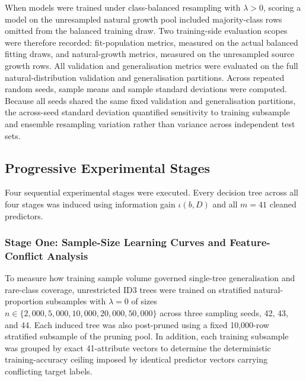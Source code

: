 When models were trained under class-balanced resampling with $\lambda > 0$, scoring a model on the unresampled natural growth pool included majority-class rows omitted from the balanced training draw. Two training-side evaluation scopes were therefore recorded: fit-population metrics, measured on the actual balanced fitting draws, and natural-growth metrics, measured on the unresampled source growth rows. All validation and generalisation metrics were evaluated on the full natural-distribution validation and generalisation partitions. Across repeated random seeds, sample means and sample standard deviations were computed. Because all seeds shared the same fixed validation and generalisation partitions, the across-seed standard deviation quantified sensitivity to training subsample and ensemble resampling variation rather than variance across independent test sets.

\subsection{Progressive Experimental Stages}
\label{subsec:emp_stages}
Four sequential experimental stages were executed. Every decision tree across all four stages was induced using information gain $\iota(b, D)$ and all $m = 41$ cleaned predictors.

\subsubsection{Stage One: Sample-Size Learning Curves and Feature-Conflict Analysis}
To measure how training sample volume governed single-tree generalisation and rare-class coverage, unrestricted ID3 trees were trained on stratified natural-proportion subsamples with $\lambda = 0$ of sizes $n \in \{2{,}000, 5{,}000, 10{,}000, 20{,}000, 50{,}000\}$ across three sampling seeds, 42, 43, and 44. Each induced tree was also post-pruned using a fixed 10,000-row stratified subsample of the pruning pool. In addition, each training subsample was grouped by exact 41-attribute vectors to determine the deterministic training-accuracy ceiling imposed by identical predictor vectors carrying conflicting target labels.


